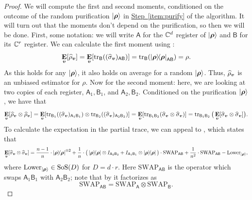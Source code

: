 \documentclass{article}
\newcommand{\symsep}{\mathrm{SoS}}
\newcommand{\swap}{\mathrm{SWAP}}
\newcommand{\reg}[1]{\mathsf{#1}}
\begin{document}
\begin{proof}
We will compute the first and second moments, conditioned on the outcome of the random purification $\ket{\boldsymbol{\rho}}$ in \hyperref[item:purify]{Step~\ref*{item:purify}} of the algorithm.
It will turn out that the moments don't depend on the purification, so then we will be done.
First, some notation: we will write $\reg{A}$ for the $\mathbb C^d$ register of $\ket{\boldsymbol{\rho}}$ and $\reg{B}$ for its $\mathbb C^r$ register.
We can calculate the first moment using :
\begin{equation*}
    \E_{\bv}[\widehat{\rho}_{\bv}]
    = \E_{\bv}[\tr_\reg{B}((\widehat{\sigma}_{\bv})_{\reg{AB}})]
    = \tr_\reg{B}(\ketbra{\brho}_{\reg{AB}})
    = \rho.
\end{equation*}
As this holds for any $\ket{\boldsymbol{\rho}}$,
it also holds on average for a random $\ket{\boldsymbol{\rho}}$.
Thus, $\widehat{\rho}_{\boldsymbol{v}}$ is an unbiased estimator for $\rho$.
Now for the second moment: here, we are looking at two copies of each register, $\reg{A}_1, \reg{B}_1$, and $\reg{A}_2, \reg{B}_2$.
Conditioned on the purification $\ket{\boldsymbol{\rho}}$, we have that
\begin{equation*}
    \E_{\bv}[\widehat{\rho}_{\bv} \otimes \widehat{\rho}_{\bv}]
    = \E_{\bv}[\tr_{\reg{B}_1}((\widehat{\sigma}_{\bv})_{\reg{A}_1\reg{B}_1}) \otimes \tr_{\reg{B}_2}((\widehat{\sigma}_{\bv})_{\reg{A}_2\reg{B}_2})]
    = \E_{\bv}[\tr_{\reg{B}_1 \reg{B}_2}(\widehat{\sigma}_{\bv} \otimes \widehat{\sigma}_{\bv})]
    = \tr_{\reg{B}_1 \reg{B}_2}\big(\E_{\bv}[\widehat{\sigma}_{\bv} \otimes \widehat{\sigma}_{\bv}]\big).
\end{equation*}
To calculate the expectation in the partial trace, we can appeal to , which states that
\begin{equation*}
    \E_{\bv}[\widehat{\sigma}_{\bv}\otimes \widehat{\sigma}_{\bv}] = \frac{n-1}{n} \cdot \ketbra{\brho}^{\otimes 2} + \frac{1}{n} \cdot \big(\ketbra{\brho} \otimes I_{\reg{A}_2 \reg{B}_2} + I_{\reg{A}_1 \reg{B}_1} \otimes \ketbra{\brho}\big) \cdot \swap_{\reg{A} \reg{B}} + \frac{1}{n^2} \cdot \swap_{\reg{A} \reg{B}}-\mathrm{Lower}_{\ket{\brho}},
\end{equation*}
where $\mathrm{Lower}_{\ket{\brho}} \in \symsep(D)$ for $D = d\cdot r$.
Here $\swap_{\reg{A} \reg{B}}$ is the operator which swaps $\reg{A}_1 \reg{B}_1$ with $\reg{A}_2\reg{B}_2$; note that by  it factorizes as
\begin{equation*}\swap_{\reg{A} \reg{B}} = \swap_{\reg{A}} \otimes \swap_{\reg{B}}.

\end{equation*}
\end{proof}
\end{document}
